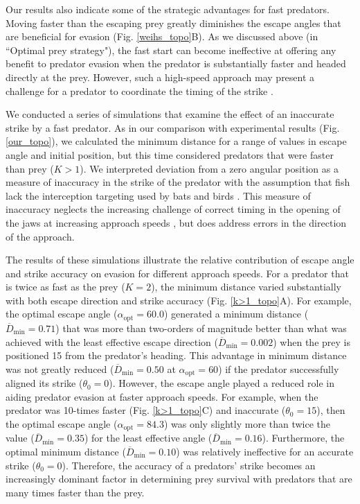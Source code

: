 \documentclass[12pt]{article}
\newcommand{\ol}{\overline}
\begin{document}
Our results also indicate some of the strategic advantages for fast predators. Moving faster than the escaping prey greatly diminishes the escape angles that are beneficial for evasion (Fig. \ref{weihs_topo}B). 
As we discussed above (in ``Optimal prey strategy"), the fast start can become ineffective at offering any benefit to predator evasion when the predator is substantially faster and headed directly at the prey. However, such a high-speed approach may present a challenge for a predator to coordinate the timing of the strike \citep{Higham:2007go, Higham:2005iu}. 

We conducted a series of simulations that examine the effect of an inaccurate strike by a fast predator. As in our comparison with experimental results (Fig. \ref{our_topo}), we calculated the minimum distance for a range of values in escape angle and initial position, but this time considered predators that were faster than prey ($K>1$). 
We interpreted deviation from a zero angular position as a measure of inaccuracy in the strike of the predator with the assumption that fish lack the interception targeting used by bats \citep{Ghose:2006dk} and birds \citep{Kane:2014fs}. This measure of inaccuracy neglects the increasing challenge of correct timing in the opening of the jaws at increasing approach speeds \citep{Kane:2014bh,Kane:2011hz}, but does address errors in the direction of the approach.

The results of these simulations illustrate the relative contribution of escape angle and strike accuracy on evasion for different approach speeds. For a predator that is twice as fast as the prey ($K=2$), the minimum distance varied substantially with both escape direction and strike accuracy (Fig. \ref{k>1_topo}A). 
For example, the optimal escape angle ($\alpha_{\text{opt}}=60.0$\textdegree) generated a minimum distance ($\ol D_{\text{min}}=0.71$) that was more than two-orders of magnitude better than what was achieved with the least effective escape direction ($\ol D_{\text{min}}=0.002$) when the prey is positioned 15\textdegree\hspace{0.5pt} from the predator's heading. 
This advantage in minimum distance was not greatly reduced ($\ol D_{\text{min}}=0.50$ at $\alpha_{\text{opt}}=60$\textdegree) if the predator successfully aligned its strike ($\theta_0=0$\textdegree). 
However, the escape angle played a reduced role in aiding predator evasion at faster approach speeds. For example, when the predator was 10-times faster  (Fig. \ref{k>1_topo}C) and inaccurate ($\theta_0=15$\textdegree), then the optimal escape angle ($\alpha_{\text{opt}}=84.3$\textdegree) was only slightly more than twice the value ($\ol D_{\text{min}}=0.35$) for the least effective angle ($\ol D_{\text{min}}=0.16$). 
Furthermore, the optimal minimum distance ($\ol D_{\text{min}}=0.10$) was relatively ineffective for an accurate strike ($\theta_0=0$\textdegree). 
Therefore, the accuracy of a predators' strike becomes an increasingly dominant factor in determining prey survival with predators that are many times faster than the prey.
\end{document}
